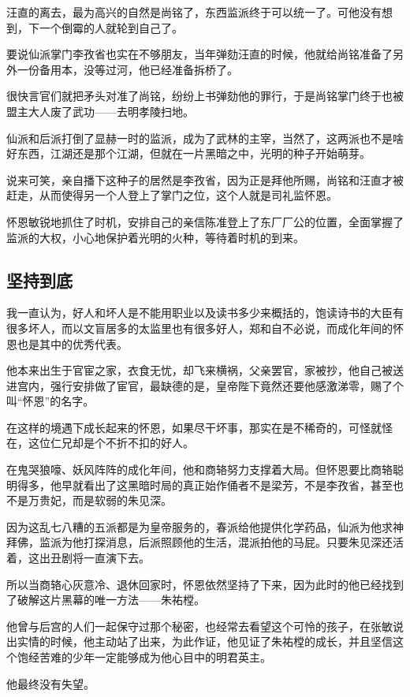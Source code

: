 \begin{multicols}{\theparacolNo}
		汪直的离去，最为高兴的自然是尚铭了，东西监派终于可以统一了。可他没有想到，下一个倒霉的人就轮到自己了。

		要说仙派掌门李孜省也实在不够朋友，当年弹劾汪直的时候，他就给尚铭准备了另外一份备用本，没等过河，他已经准备拆桥了。

		很快言官们就把矛头对准了尚铭，纷纷上书弹劾他的罪行，于是尚铭掌门终于也被盟主大人废了武功——去明孝陵扫地。

		仙派和后派打倒了显赫一时的监派，成为了武林的主宰，当然了，这两派也不是啥好东西，江湖还是那个江湖，但就在一片黑暗之中，光明的种子开始萌芽。

		说来可笑，亲自播下这种子的居然是李孜省，因为正是拜他所赐，尚铭和汪直才被赶走，从而使得另一个人登上了掌门之位，这个人就是司礼监怀恩。

		怀恩敏锐地抓住了时机，安排自己的亲信陈准登上了东厂厂公的位置，全面掌握了监派的大权，小心地保护着光明的火种，等待着时机的到来。

		\subsection{坚持到底}
		我一直认为，好人和坏人是不能用职业以及读书多少来概括的，饱读诗书的大臣有很多坏人，而以文盲居多的太监里也有很多好人，郑和自不必说，而成化年间的怀恩也是其中的优秀代表。

		他本来出生于官宦之家，衣食无忧，却飞来横祸，父亲罢官，家被抄，他自己被送进宫内，强行安排做了宦官，最缺德的是，皇帝陛下竟然还要他感激涕零，赐了个叫“怀恩”的名字。

		在这样的境遇下成长起来的怀恩，如果尽干坏事，那实在是不稀奇的，可怪就怪在，这位仁兄却是个不折不扣的好人。

		在鬼哭狼嚎、妖风阵阵的成化年间，他和商辂努力支撑着大局。但怀恩要比商辂聪明得多，他早就看出了这黑暗时局的真正始作俑者不是梁芳，不是李孜省，甚至也不是万贵妃，而是软弱的朱见深。

		因为这乱七八糟的五派都是为皇帝服务的，春派给他提供化学药品，仙派为他求神拜佛，监派为他打探消息，后派照顾他的生活，混派拍他的马屁。只要朱见深还活着，这出丑剧将一直演下去。

		所以当商辂心灰意冷、退休回家时，怀恩依然坚持了下来，因为此时的他已经找到了破解这片黑幕的唯一方法——朱祐樘。

		他曾与后宫的人们一起保守过那个秘密，也经常去看望这个可怜的孩子，在张敏说出实情的时候，他主动站了出来，为此作证，他见证了朱祐樘的成长，并且坚信这个饱经苦难的少年一定能够成为他心目中的明君英主。

		他最终没有失望。


\end{multicols}
